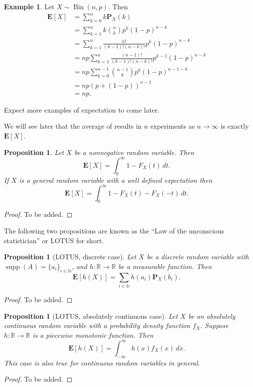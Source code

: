 \documentclass[11pt,a4paper]{article}
\theoremstyle{definition}
\newtheorem{example}{Example}[section]
\theoremstyle{plain}
\newtheorem{proposition}[theorem]{Proposition}
\DeclareMathOperator{\supp}{supp}
\DeclareMathOperator{\Bin}{Bin}
\newcommand{\N}{\mathbb{N}}
\newcommand{\R}{\mathbb{R}}
\begin{document}
  \begin{example}
    Let $X \sim \Bin(n,p)$. Then
    \begin{align*}
      \mathbf{E}[X] &= \sum_{k=0}^{n} k \mathbf{P}_{X}(k) \\
      &= \sum_{k=1}^{n} k \binom{n}{k} p^k (1-p)^{n-k} \\
      &= \sum_{k=1}^{n} \frac{n!}{(k-1)!(n-k)!} p^{k} (1-p)^{n-k} \\
      &= n p \sum_{k=1}^{n} \frac{(n-1)!}{(k-1)!(n-k)!} p^{k-1} (1-p)^{n-k} \\
      &= n p\sum_{k=0}^{n-1}{\binom{n-1}{k}}p^{k}(1-p)^{n-1-k} \\
      &= n p(p+(1-p))^{n-1} \\
      &= n p.
    \end{align*}
  \end{example}

  Expect more examples of expectation to come later.

  We will see later that the average of results in $n$ experiments as
  $n \to \infty$ is exactly $\mathbf E[X]$.

  \begin{proposition}
    Let $X$ be a nonnegative random variable. Then
    \[
      \mathbf E[X] = \int_{0}^{\infty} 1 - F_X(t)\,dt.
    \]
    If $X$ is a general random variable with a well defined expectation
    then
    \[
      \mathbf E[X] = \int_{0}^{\infty} 1 - F_X(t) - F_X(-t)\,dt.
    \]
  \end{proposition}
  \begin{proof}
    To be added.
  \end{proof}

  The following two propositions are known as the 
  ``Law of the unconscious statistician'' or LOTUS for short.
  \begin{proposition}[LOTUS, discrete case]
    Let $X$ be a discrete random variable with $\supp(A) = \{a_i\}_{i \in \N}$,
    and $h \colon \R \to \R$ be a measurable function. Then
    \[
      \mathbf E[h(X)] = \sum_{i \in \N} h(a_i) \mathbf P_X(b_i).
    \]
  \end{proposition}
  \begin{proof}
    To be added.
  \end{proof}
  
  \begin{proposition}[LOTUS, absolutely continuous case]
    Let $X$ be an absolutely continuous random variable with a probability
    density function $f_X$.
    Suppose $h \colon \R \to \R$ is a piecewise monotonic function. Then
    \[
      \mathbf E[h(X)] = \int_{-\infty}^{\infty} h(x) f_X(x)\,dx.
    \]
    This case is also true for continuous random variables in general.
  \end{proposition}
  \begin{proof}
    To be added.
  \end{proof}
  
\end{document}
